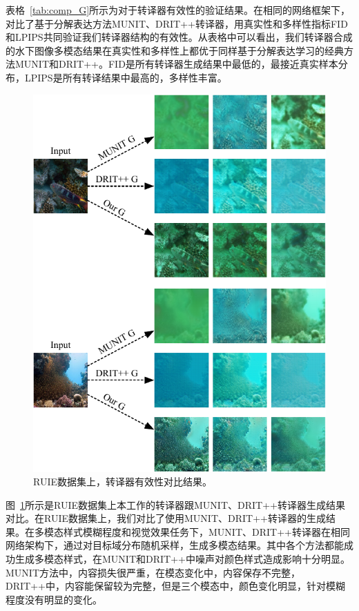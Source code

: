 表格~\ref{tab:comp_G}所示为对于转译器有效性的验证结果。在相同的网络框架下，对比了基于分解表达方法MUNIT、DRIT++转译器，用真实性和多样性指标FID和LPIPS共同验证我们转译器结构的有效性。从表格中可以看出，我们转译器合成的水下图像多模态结果在真实性和多样性上都优于同样基于分解表达学习的经典方法MUNIT和DRIT++。FID是所有转译器生成结果中最低的，最接近真实样本分布，LPIPS是所有转译结果中最高的，多样性丰富。

\begin{figure}[htp]
    \centering
  \includegraphics[width=\textwidth]{figures/Ablation_modal_ruie.pdf}
  \caption{RUIE数据集上，转译器有效性对比结果。}
  \label{fig:ablation_modal_ruie}
\end{figure}

图~\ref{fig:ablation_modal_ruie}所示是RUIE数据集上本工作的转译器跟MUNIT、DRIT++转译器生成结果对比。在RUIE数据集上，我们对比了使用MUNIT、DRIT++转译器的生成结果。在多模态样式模糊程度和视觉效果任务下，MUNIT、DRIT++转译器在相同网络架构下，通过对目标域分布随机采样，生成多模态结果。其中各个方法都能成功生成多模态样式，在MUNIT和DRIT++中噪声对颜色样式造成影响十分明显。MUNIT方法中，内容损失很严重，在模态变化中，内容保存不完整，DRIT++中，内容能保留较为完整，但是三个模态中，颜色变化明显，针对模糊程度没有明显的变化。

